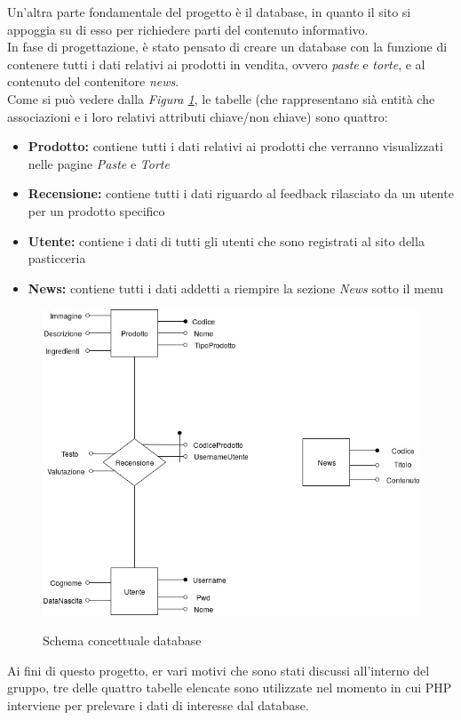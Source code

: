 Un'altra parte fondamentale del progetto è il database, in quanto il sito si appoggia su di esso per richiedere parti del contenuto informativo.\\ 
In fase di progettazione, è stato pensato di creare un database con la funzione di contenere tutti i dati relativi ai prodotti in vendita, ovvero \emph{paste} e \emph{torte}, 
e al contenuto del contenitore \emph{news}.\\
Come si può vedere dalla \emph{Figura \ref{Fig:schemadb}}, le tabelle (che rappresentano sià entità che associazioni e i loro relativi attributi chiave/non chiave) sono quattro:
\begin{itemize}
		\item \textbf{Prodotto:} contiene tutti i dati relativi ai prodotti che verranno visualizzati nelle pagine \emph{Paste} e \emph{Torte}
		\item \textbf{Recensione:} contiene tutti i dati riguardo al feedback rilasciato da un utente per un prodotto specifico
		\item \textbf{Utente:} contiene i dati di tutti gli utenti che sono registrati al sito della pasticceria
		\item \textbf{News:} contiene tutti i dati addetti a riempire la sezione \emph{News} sotto il menu 
\end{itemize}
\begin{figure}[!h]
	\centering
	\includegraphics[width=0.7\linewidth]{sezioni/Progettazione/Immagini/schema_concettuale.jpg}\\
    \caption{Schema concettuale database}
	\label{Fig:schemadb}
\end{figure}
Ai fini di questo progetto, er vari motivi che sono stati discussi all'interno del gruppo, tre delle quattro tabelle elencate sono utilizzate nel momento in cui PHP interviene per 
prelevare i dati di interesse dal database.\\
